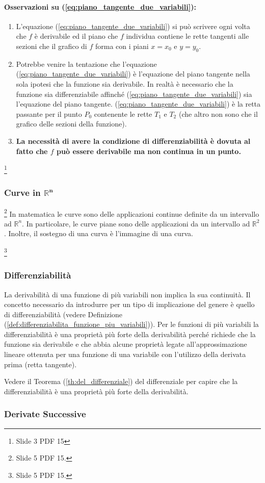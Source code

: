 \paragraph{Osservazioni su (\ref{eq:piano_tangente_due_variabili}):} 
\begin{enumerate}
	\item L'equazione (\ref{eq:piano_tangente_due_variabili}) si può scrivere ogni volta che $f$ è derivabile ed il piano che $f$ individua contiene le rette tangenti alle sezioni che il grafico di $f$ forma con i piani $x=x_0$ e $y=y_0$.
	\item Potrebbe venire la tentazione che l'equazione (\ref{eq:piano_tangente_due_variabili}) è l'equazione del piano tangente nella sola ipotesi che la funzione sia derivabile. In realtà è necessario che la funzione sia differenziabile affinché (\ref{eq:piano_tangente_due_variabili}) sia l'equazione del piano tangente.
	(\ref{eq:piano_tangente_due_variabili}) è la retta passante per il punto $P_0$ contenente le rette $T_1$ e $T_2$ (che altro non sono che il grafico delle sezioni della funzione).
	\item \textbf{La necessità di avere la condizione di differenziabilità è dovuta al fatto che $f$ può essere derivabile ma non continua in un punto.}
\end{enumerate}

\begin{example}\footnote{Slide 3 PDF 15}
	
\end{example}

\subsubsection{Curve in \texorpdfstring{$\boldsymbol{\mathbb R^n}$}{Rn}}\label{ssec:curve_Rn}\footnote{Slide 5 PDF 15.}
In matematica le curve sono delle applicazioni continue definite da un intervallo ad $\mathbb R^n$. In particolare, le curve piane sono delle applicazioni da un intervallo ad $\mathbb R^2$. Inoltre, il sostegno di una curva è l'immagine di una curva.
\begin{definition}
	\footnote{Slide 5 PDF 15.}
\end{definition}

\subsubsection{Differenziabilità}
La derivabilità di una funzione di più variabili non implica la sua continuità. Il concetto necessario da introdurre per un tipo di implicazione del genere è quello di differenziabilità (vedere Definizione (\ref{def:differenziabilita_funzione_piu_variabili})). Per le funzioni di più variabili la differenziabilità è una proprietà più forte della derivabilità perché richiede che la funzione sia derivabile e che abbia alcune proprietà legate all'approssimazione lineare ottenuta per una funzione di una variabile con l'utilizzo della derivata prima (retta tangente).

Vedere il Teorema (\ref{th:del_differenziale}) del differenziale per capire che la differenziabilità è una proprietà più forte della derivabilità.

\subsubsection{Derivate Successive}